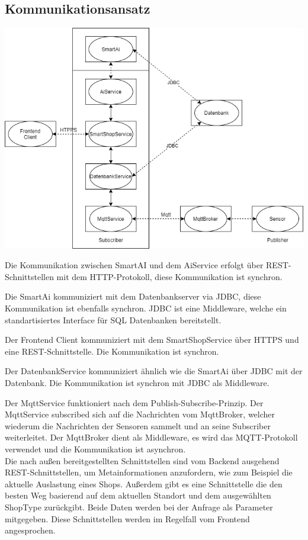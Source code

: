 \documentclass[runningheads]{llncs}
\begin{document}
\subsection{Kommunikationsansatz}
\includegraphics[width=\linewidth]{images/Kommunikation}

Die Kommunikation zwischen SmartAI und dem AiService erfolgt über REST-Schnittstellen mit dem HTTP-Protokoll, diese Kommunikation ist synchron.

Die SmartAi kommuniziert mit dem Datenbankserver via JDBC, diese Kommunikation ist ebenfalls synchron. JDBC ist eine Middleware, welche ein standartisiertes Interface für SQL Datenbanken bereitstellt.

Der Frontend Client kommuniziert mit dem SmartShopService über HTTPS und eine REST-Schnittstelle. Die Kommunikation ist synchron.

Der DatenbankService kommuniziert ähnlich wie die SmartAi über JDBC mit der Datenbank. Die Kommunikation ist synchron mit JDBC als Middleware.

Der MqttService funktioniert nach dem Publish-Subscribe-Prinzip. Der MqttService subscribed sich auf die Nachrichten vom MqttBroker, welcher wiederum die Nachrichten der Sensoren sammelt und an seine Subscriber weiterleitet.
Der MqttBroker dient als Middleware, es wird das MQTT-Protokoll verwendet und die Kommunikation ist asynchron. \\

Die nach außen bereitgestellten Schnittstellen sind vom Backend ausgehend REST-Schnittstellen, um Metainformationen anzufordern, wie zum Beispiel die aktuelle Auslastung eines Shops.
Außerdem gibt es eine Schnittstelle die den besten Weg basierend auf dem aktuellen Standort und dem ausgewählten ShopType zurückgibt.
Beide Daten werden bei der Anfrage als Parameter mitgegeben.
Diese Schnittstellen werden im Regelfall vom Frontend angesprochen.
\end{document}
